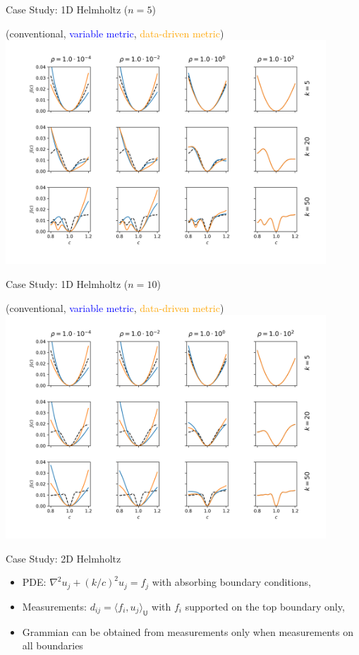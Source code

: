 \documentclass{beamer}
\newcommand{\sU}{\mathsf{U}}
\begin{document}
\begin{frame}{Case Study: 1D Helmholtz ($n=5$)}
  \begin{center}
(conventional, \textcolor{blue}{variable metric}, \textcolor{orange}{data-driven metric})
\includegraphics[width=0.9\textwidth]{../paper/figures/Helmholtz1D_5.png}
  \end{center}
\end{frame}

\begin{frame}{Case Study: 1D Helmholtz ($n=10$)}
  \begin{center}
(conventional, \textcolor{blue}{variable metric}, \textcolor{orange}{data-driven metric})
\includegraphics[width=0.9\textwidth]{../paper/figures/Helmholtz1D_10.png}
  \end{center}
\end{frame}

\begin{frame}{Case Study: 2D Helmholtz}
\begin{itemize}
  \item PDE: $\nabla^2 u_j + (k/c)^2u_j = f_j$ with absorbing boundary conditions,
  \item Measurements: $d_{ij} = \langle f_i, u_j\rangle_\sU$ with $f_i$ supported on the top boundary only,
  \item Grammian can be obtained from measurements only when measurements on all boundaries \cite{tataris2025inverse}
\end{itemize}
\end{frame}
\end{document}

